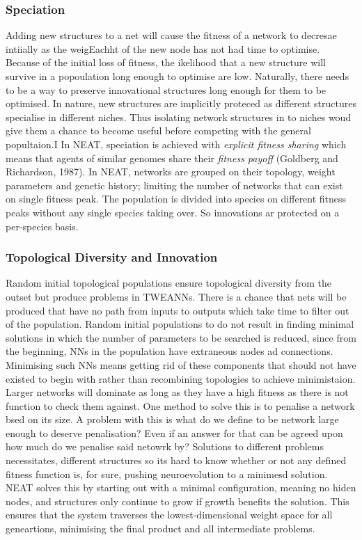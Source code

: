 \documentclass{article}
\begin{document}
\subsubsection*{Speciation}
Adding new structures to a net will cause the fitness of a network to decresae intiially as the weigEachht of the new node has not had time to optimise.
Because of the initial loss of fitness, the ikelihood that a new structure will survive in a popoulation long enough to optimise are low.
Naturally, there needs to be a way to preserve innovational structures long enough for them to be optimised.
In nature, new structures are implicitly proteced as different structures specialise in different niches.
Thus isolating network structures in to niches woud give them a chance to become useful before competing with the general popultaion.I
In NEAT, speciation is achieved with \emph{explicit fitness sharing} which means that agents of similar genomes share their \emph{fitness payoff}
(Goldberg and Richardson, 1987).
In NEAT, networks are grouped on their topology, weight parameters and genetic history; limiting the number of networks that can
exist on single fitness peak. The population is divided into species on different fitness peaks without any single species taking over.
So innovations ar protected on a per-species basis.

\subsubsection*{Topological Diversity and Innovation}
Random initial topological populations ensure topological diversity from the outset but produce problems in TWEANNs.
There is a chance that nets will be produced that have no path from inputs to outputs which take time to filter out of the population.
Random initial populations to do not result in finding minimal solutions in which the number of parameters to be searched is reduced,
since from the beginning, NNs in the population have extraneous nodes ad connections.
Minimising such NNs means getting rid of these components that should not have existed to begin with rather than recombining topologies to achieve minimistaion.
Larger networks will dominate as long as they have a high fitness as there is not function to check them against.
One method to solve this is to penalise a network bsed on its size.
A problem with this is what do we define to be network large enough to deserve penalisation? Even if an answer for that can be agreed upon how much do we
penalise said netowrk by? Solutions to different problems necessitates, different structures so its hard to know whether or not any defined fitness function is,
for sure, pushing neuroevolution to a minimesd solution.
NEAT solves this by starting out with a minimal configuration, meaning no hiden nodes, and structures only continue to grow if growth benefits the solution.
This ensures that the system traverses the lowest-dimensional weight space for all geneartions, minimising the final product and all intermediate problems.
\end{document}
